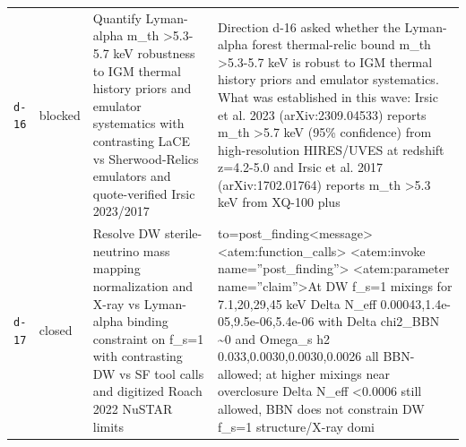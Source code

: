 \documentclass[11pt,a4paper]{article}
\begin{document}
\begin{longtable}{@{}p{}p{}p{}p{}@{}}
\texttt{d-16} & blocked & Quantify Lyman-alpha m\_th \textgreater{}5.3-5.7 keV robustness to IGM thermal history priors and emulator systematics with contrasting LaCE vs Sherwood-Relics emulators and quote-verified Irsic 2023/2017 & Direction d-16 asked whether the Lyman-alpha forest thermal-relic bound m\_th \textgreater{}5.3-5.7 keV is robust to IGM thermal history priors and emulator systematics. What was established in this wave: Irsic et al. 2023 (arXiv:2309.04533) reports m\_th \textgreater{}5.7 keV (95\% confidence) from high-resolution HIRES/UVES at redshift z=4.2-5.0 and Irsic et al. 2017 (arXiv:1702.01764) reports m\_th \textgreater{}5.3 keV from XQ-100 plus \\
\texttt{d-17} & closed & Resolve DW sterile-neutrino mass mapping normalization and X-ray vs Lyman-alpha binding constraint on f\_s=1 with contrasting DW vs SF tool calls and digitized Roach 2022 NuSTAR limits & to=post\_finding\textless{}\textbar{}message\textbar{}\textgreater{}\textless{}atem:function\_calls\textgreater{}
\textless{}atem:invoke name=''post\_finding''\textgreater{}
\textless{}atem:parameter name=''claim''\textgreater{}At DW f\_s=1 mixings for 7.1,20,29,45 keV Delta N\_eff 0.00043,1.4e-05,9.5e-06,5.4e-06 with Delta chi2\_BBN \textasciitilde{}0 and Omega\_s h2 0.033,0.0030,0.0030,0.0026 all BBN-allowed; at higher mixings near overclosure Delta N\_eff \textless{}0.0006 still allowed, BBN does not constrain DW f\_s=1 structure/X-ray domi \\
\bottomrule\end{longtable}
\end{document}
